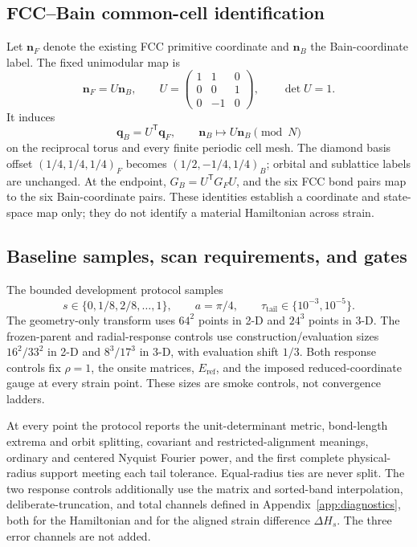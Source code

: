 \documentclass[11pt]{article}
\begin{document}
\subsection{FCC--Bain common-cell identification}

Let $\mathbf n_F$ denote the existing FCC primitive coordinate and $\mathbf n_B$ the
Bain-coordinate label. The fixed unimodular map is
\begin{equation}
 \mathbf n_F=U\mathbf n_B,
 \qquad
 U=\begin{pmatrix}
 1&1&0\\
 0&0&1\\
 0&-1&0
 \end{pmatrix},
 \qquad \det U=1.
 \label{eq:strain-common-cell-map}
\end{equation}
It induces
\begin{equation}
 \mathbf q_B=U^{\mathsf T}\mathbf q_F,
 \qquad
 \mathbf n_B\longmapsto U\mathbf n_B\pmod N
 \label{eq:strain-reciprocal-cell-map}
\end{equation}
on the reciprocal torus and every finite periodic cell mesh. The diamond basis offset
$(1/4,1/4,1/4)_F$ becomes $(1/2,-1/4,1/4)_B$; orbital and sublattice labels are
unchanged. At the endpoint, $G_B=U^{\mathsf T}G_FU$, and the six FCC bond pairs map to
the six Bain-coordinate pairs. These identities establish a coordinate and state-space
map only; they do not identify a material Hamiltonian across strain.

\subsection{Baseline samples, scan requirements, and gates}

The bounded development protocol samples
\begin{equation}
 s\in\{0,1/8,2/8,\ldots,1\},
 \qquad a=\pi/4,
 \qquad \tau_{\mathrm{tail}}\in\{10^{-3},10^{-5}\}.
 \label{eq:strain-frozen-samples}
\end{equation}
The geometry-only transform uses $64^2$ points in 2-D and $24^3$ points in 3-D. The
frozen-parent and radial-response controls use construction/evaluation sizes
$16^2/33^2$ in 2-D and $8^3/17^3$ in 3-D, with evaluation shift $1/3$. Both response
controls fix $\rho=1$, the onsite matrices, $E_{\mathrm{ref}}$, and the imposed
reduced-coordinate gauge at every strain point. These sizes are smoke controls, not
convergence ladders.

At every point the protocol reports the unit-determinant metric, bond-length extrema and
orbit splitting, covariant and restricted-alignment meanings, ordinary and centered
Nyquist Fourier power, and the first complete physical-radius support meeting each tail
tolerance. Equal-radius ties are never split. The two response controls additionally use
the matrix and sorted-band interpolation, deliberate-truncation, and total channels
defined in Appendix~\ref{app:diagnostics}, both for the Hamiltonian and for the aligned
strain difference $\Delta H_s$. The three error channels are not added.
\end{document}
